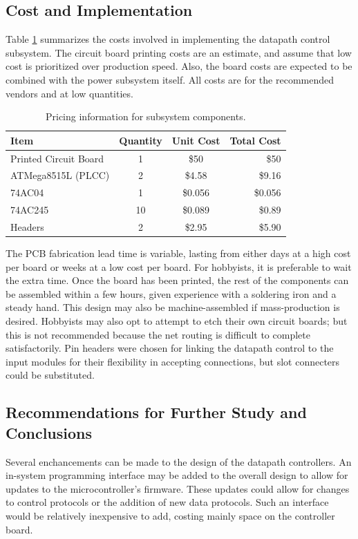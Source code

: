 \subsection{Cost and Implementation}

Table \ref{tab:datap costs} summarizes the costs involved in implementing the 
datapath control subsystem. The circuit board printing costs are an estimate, 
and assume that low cost is prioritized over production speed. Also, the board
costs are expected to be combined with the power subsystem itself. All costs 
are for the recommended vendors and at low quantities.

\begin{table}[hbp]
\caption{Pricing information for subsystem components\cite{web:batchpcb}\cite{web:jameco_atmel}\cite{web:jameco_inv}.}
\small
\begin{center}
\begin{tabular}{l | c c r}
	Item & Quantity & Unit Cost & Total Cost \\ \hline
	Printed Circuit Board & 1 & \$50 & \$50 \\
	ATMega8515L (PLCC) & 2 & \$4.58 & \$9.16 \\
	74AC04 & 1 & \$0.056 & \$0.056\\
	74AC245  & 10 & \$0.089 & \$0.89\\
	Headers & 2 & \$2.95 &  \$5.90
\end{tabular}
\end{center}
\label{tab:datap costs}
\end{table}

The PCB fabrication lead time is variable, lasting from either days at a high
 cost per board or weeks at a low cost per board. For hobbyists, it is 
preferable to wait the extra time. Once the board has been printed, the rest of
 the components can be assembled within a few hours, given experience with a 
soldering iron and a steady hand. This design may also be machine-assembled if 
mass-production is desired. Hobbyists may also opt to attempt to etch their own
 circuit boards; but this is not recommended because the net routing is 
difficult to complete satisfactorily. Pin headers were chosen for linking the datapath control to the input modules for their flexibility in accepting connections, but slot connecters could be substituted.

\subsection{Recommendations for Further Study and Conclusions}
Several enchancements can be made to the design of the datapath controllers.
An in-system programming interface may be added to the overall design to allow
for updates to the microcontroller's firmware. These updates could allow for 
changes to control protocols or the addition of new data protocols. Such an 
interface would be relatively inexpensive to add, costing mainly space on the 
controller board.

